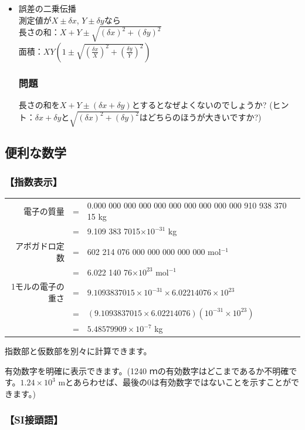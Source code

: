 \begin{itemize}
\item 誤差の二乗伝播\\
測定値が$X\pm\delta x$, $Y\pm\delta y$なら\\
長さの和：$X+Y\pm\sqrt{(\delta x)^2+(\delta y)^2}$\\
面積：$XY\left(1\pm \sqrt{(\frac{\delta x}{X})^2+(\frac{\delta y}{Y})^2}\right)$

\subsubsection*{問題}
長さの和を$X+Y\pm (\delta x+\delta y)$とするとなぜよくないのでしょうか? (ヒント：$\delta x +\delta y$と$\sqrt{(\delta x)^2+(\delta y)^2}$はどちらのほうが大きいですか?)

\end{itemize}


\subsection{便利な数学}

\subsubsection*{【指数表示】}

\begin{tabular}{rcl}
電子の質量 &=& 0.000 000 000 000 000 000 000 000 000 000 910 938 370 15 kg\\
&=& 9.109 383 7015$\times 10^{-31}$ kg\\
アボガドロ定数&=& 602 214 076 000 000 000 000 000 mol${}^{-1}$\\
&=&6.022 140 76$\times 10^{23}$ mol${}^{-1}$\\ 
1モルの電子の重さ&=&$9.1093837015\times 10^{-31}\times 6.02214076 \times 10^{23}$\\
&=&$(9.1093837015\times6.02214076) (10^{-31}\times10^{23})$\\
&=&$5.48579909\times10^{-7}$ kg 
\end{tabular}

指数部と仮数部を別々に計算できます。

有効数字を明確に表示できます。(1240 ｍの有効数字はどこまであるか不明確です。$1.24\times10^3$ mとあらわせば、最後の0は有効数字ではないことを示すことができます。)

\subsubsection*{【SI接頭語】}

